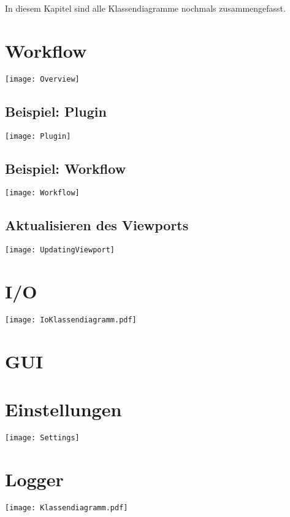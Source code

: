 In diesem Kapitel sind alle Klassendiagramme nochmals zusammengefasst.
\section{Workflow}
\graphicspath{{./img/workflow/}}
\texttt{[image: Overview]}
\subsection{Beispiel: Plugin}
\texttt{[image: Plugin]}
\subsection{Beispiel: Workflow}
\texttt{[image: Workflow]}
\subsection{Aktualisieren des Viewports}
\texttt{[image: UpdatingViewport]}
\newpage
\section{I/O}
\graphicspath{{./img/io/}}
\texttt{[image: IoKlassendiagramm.pdf]}
\newpage
\section{GUI}
\graphicspath{{./img/gui/}}
\newpage
\section{Einstellungen}
\graphicspath{{./img/settings/}}
\texttt{[image: Settings]}
\newpage
\section{Logger}
\graphicspath{{./img/logger/}}
\texttt{[image: Klassendiagramm.pdf]}
